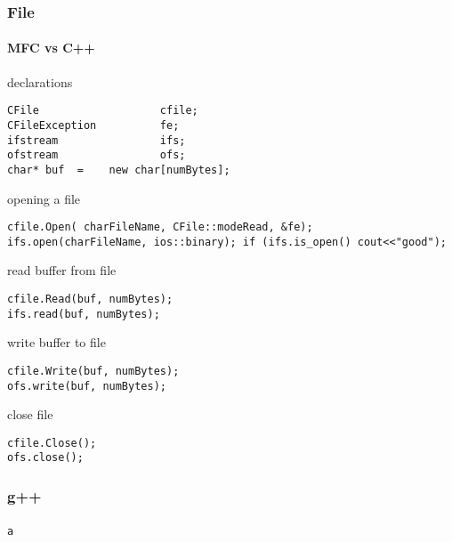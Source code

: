 \begin{frame}[fragile]
\frametitle{File}
\framesubtitle{MFC vs C++}
\logoCSIPCPL\mypagenum
\tiny
{\color{green}declarations}
\begin{verbatim}
CFile					cfile;
CFileException			fe;
ifstream				ifs;
ofstream				ofs;
char* buf  =	new char[numBytes];
\end{verbatim}
{\color{green}opening a file}
\begin{verbatim}
cfile.Open( charFileName, CFile::modeRead, &fe);
ifs.open(charFileName, ios::binary); if (ifs.is_open() cout<<"good");
\end{verbatim}
\tiny
{\color{green}read buffer from file}
\begin{verbatim}
cfile.Read(buf, numBytes);
ifs.read(buf, numBytes);
\end{verbatim}
\tiny
{\color{green}write buffer to file}
\begin{verbatim}
cfile.Write(buf, numBytes);
ofs.write(buf, numBytes);
\end{verbatim}
\tiny
{\color{green} close file}
\begin{verbatim}
cfile.Close();
ofs.close();
\end{verbatim}
\end{frame}


\begin{frame}[fragile]
\frametitle{g++}
\framesubtitle{}
\logoCSIPCPL\mypagenum
\tiny
\begin{verbatim}
a
\end{verbatim}
\end{frame}

